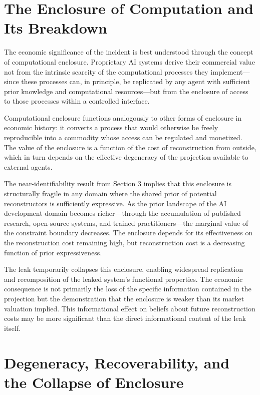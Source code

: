 \documentclass[12pt, oneside]{article}
\theoremstyle{plain}
\theoremstyle{definition}
\theoremstyle{remark}
\begin{document}
\section{The Enclosure of Computation and Its Breakdown}

The economic significance of the incident is best understood through the concept of
computational enclosure. Proprietary AI systems derive their commercial value not from the
intrinsic scarcity of the computational processes they implement---since these processes
can, in principle, be replicated by any agent with sufficient prior knowledge and
computational resources---but from the enclosure of access to those processes within a
controlled interface.

Computational enclosure functions analogously to other forms of enclosure in economic
history: it converts a process that would otherwise be freely reproducible into a commodity
whose access can be regulated and monetized. The value of the enclosure is a function of
the cost of reconstruction from outside, which in turn depends on the effective degeneracy
of the projection available to external agents.

The near-identifiability result from Section 3 implies that this enclosure is structurally
fragile in any domain where the shared prior of potential reconstructors is sufficiently
expressive. As the prior landscape of the AI development domain becomes richer---through
the accumulation of published research, open-source systems, and trained practitioners---the
marginal value of the constraint boundary decreases. The enclosure depends for its
effectiveness on the reconstruction cost remaining high, but reconstruction cost is a
decreasing function of prior expressiveness.

The leak temporarily collapses this enclosure, enabling widespread replication and
recomposition of the leaked system's functional properties. The economic consequence is not
primarily the loss of the specific information contained in the projection but the
demonstration that the enclosure is weaker than its market valuation implied. This
informational effect on beliefs about future reconstruction costs may be more significant
than the direct informational content of the leak itself.

\section{Degeneracy, Recoverability, and the Collapse of Enclosure}
\end{document}
